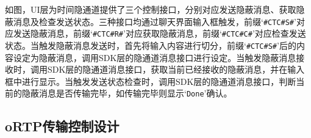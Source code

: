 
如图，UI层为时间隐通道提供了三个控制接口，分别对应发送隐蔽消息、获取隐蔽消息及检查发送状态。三种接口均通过聊天界面输入框触发，前缀‘\texttt{\#CTC\#S\#}’对应发送隐蔽消息，前缀‘\texttt{\#CTC\#R\#}’对应获取隐蔽消息，前缀‘\texttt{\#CTC\#C\#}’对应检查发送状态。当触发隐蔽消息发送时，首先将输入内容进行切分，前缀‘\texttt{\#CTC\#S\#}’后的内容设定为隐蔽消息，调用SDK层的隐通道消息接口进行设定。当触发隐蔽消息接收时，调用SDK层的隐通道消息接口，获取当前已经接收的隐蔽消息，并在输入框中进行显示。当触发发送状态检查时，调用SDK层的隐通道消息接口，判断当前的隐蔽消息是否传输完毕，如传输完毕则显示‘\texttt{Done}’确认。

\subsection{oRTP传输控制设计}
\label{chap:linphone:designation:ortp}


